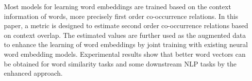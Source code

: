 Most models for learning word embeddings are trained based on the context information of words, more precisely first order co-occurrence relations. In this paper, a metric is designed to estimate second order co-occurrence relations based on context overlap. The estimated values are further used as the augmented data to enhance the learning of word embeddings by joint training with existing neural word embedding models. Experimental results show that better word vectors can be obtained for word similarity tasks and some downstream NLP tasks by the enhanced approach.
